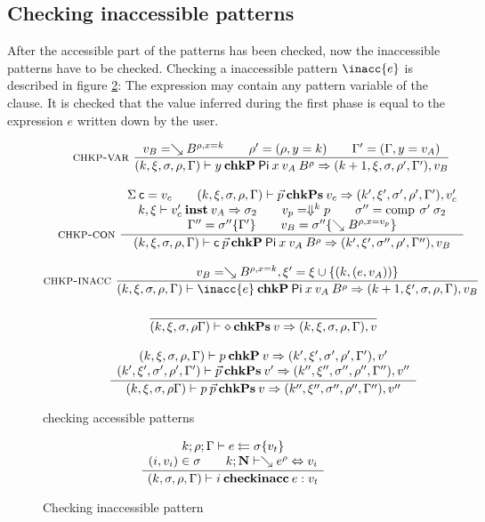\subsection{Checking inaccessible patterns}

After the accessible part of the patterns has been checked, now the inaccessible patterns have to be checked.
Checking a inaccessible pattern $\inacc{e}$ is described in figure \ref{fphase2}: 
The expression may contain any pattern variable of the clause. 
It is checked that the value inferred during the first phase is equal to the expression $e$ written down by the user.

\begin{figure}[htp]
\begin{gather*}
\nru{\chkpvar}
{v_B = \wh \cl{B}{\ins{\rho}{x}{k}} \qquad \rho' =(\ins{\rho}{y}{k}) \qquad \Gamma' = (\ins{\Gamma}{y}{v_A})}
{
\checkp
{k,\xi,\sigma,\rho,\Gamma}
{y}
{\vpi \: x \: v_A \: \cl{B}{\rho}}
{k+1,\xi,\sigma,\rho',\Gamma'}
{v_B}}
\\[2ex]
\nxru{\chkpcon}
{\Sig \: {\cc}=v_c \qquad
\checkps{k,\xi,\sigma,\rho,\Gamma}
{\vec{p}}
{v_c}
{k',\xi',\sigma',\rho',\Gamma'}
{v'_c}
}
{\unify{k}{\xi}{v'_c}{v_A}{\sigma_2}
\qquad
v_p = \ptv{k}{p}    
\qquad
\sigma'' = \compS{\sigma'}{\sigma_2}
}
{
\Gamma'' = \substEnv{\sigma''}{\Gamma'} \qquad
v_B = \subst{\sigma''}{\wh \cl{B}{\ins{\rho}{x}{v_p}}}
}
{\checkp
{k,\xi,\sigma,\rho,\Gamma}
{\cc \: \vec{p}}
{\vpi \: x \: v_A \: \cl{B}{\rho}}
{k',\xi',\sigma'',\rho',\Gamma''}
{v_B}
}
\\[2ex]
\nru{\chkpinacc}
{v_B = \wh \cl{B}{\ins{\rho}{x}{k}} , \xi' = \xi \cup \{ (k,(e,v_A)) \} } 
{
\checkp
{k,\xi,\sigma,\rho,\Gamma}
{\inacc{e}}
{\vpi \: x \: v_A \: \cl{B}{\rho}}
{k+1,\xi',\sigma,\rho,\Gamma}
{v_B}}
\\[2ex]
\nru{}
{}
{
\checkps
{k,\xi,\sigma,\rho\Gamma}
{\diamond}
{v}
{k,\xi,\sigma,\rho,\Gamma}
{v}}
\\[2ex]
\ndru{}
{\checkp
{k,\xi,\sigma,\rho,\Gamma}
{p}
{v}
{k',\xi',\sigma',\rho',\Gamma'}
{v'}
}
{\checkps
{k',\xi',\sigma',\rho',\Gamma'}
{\vec{p}}
{v'}
{k'',\xi'',\sigma'',\rho'',\Gamma''}
{v''}
}
{
\checkps
{k,\xi,\sigma,\rho\Gamma}
{p \: \vec{p}}
{v}
{k'',\xi'',\sigma'',\rho'',\Gamma''}
{v''}}
\end{gather*}
\caption{checking accessible patterns}
\label{fphase1}
\end{figure}

\begin{figure}[htp]
\begin{gather*}
\ \dfrac{\begin{array}[b]{c}
k;\rho;\Gamma\vdash e\leftleftarrows\sigma\{v_t\}
\\
(i,v_i) \in \sigma \qquad k;\mathbf{N}\vdash\searrow e^{\rho}\Leftrightarrow v_i
\end{array}}{
(k,\sigma,\rho,\Gamma)\vdash i\:\mathbf{checkinacc}\:e : v_t
}
\end{gather*}
\caption{Checking inaccessible pattern}
\label{fphase2}
\end{figure}

